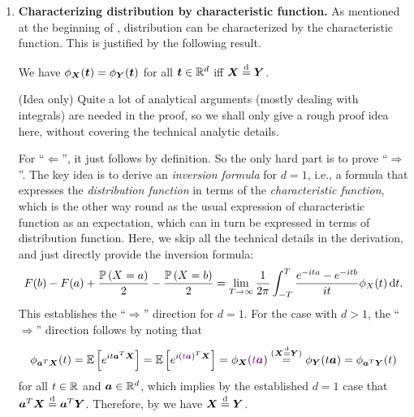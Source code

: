 \begin{enumerate}
\begin{pf}
``\(\Leftarrow\)'': The idea is similar. Fix any \(\vect{a}\in\R^{d}\) and assume
\(\vect{a}^{T}\vect{X}\eqd\vect{a}^{T}\vect{Y}\). Taking
\(\vect{X}_n=\vect{X}\)
for every \(n\in\N\), we have
\(\vect{a}^{T}\vect{X}_n\tod \vect{a}^{T}\vect{X}\)
and \(\vect{a}^{T}\vect{X}_n\tod \vect{a}^{T}\vect{Y}\). Hence,
applying  twice yields \(\vect{X}_n\tod
\vect{X}\) and \(\vect{X}_n\tod\vect{Y}\)
for all \(\vect{a}\in\R^{d}\). Due to the uniqueness of limiting distribution
(), we must then have
\(\vect{X}\eqd \vect{Y}\) for all
\(\vect{a}\in\R^{d}\).
\end{pf}
\item \textbf{Characterizing distribution by characteristic function.}
As mentioned at the beginning of , distribution can be
characterized by the characteristic function. This is justified by the
following result.
\begin{theorem}
\label{thm:cf-char-dist}
We have \(\phi_{\bm{X}}(\bm{t})=\phi_{\bm{Y}}(\bm{t})\) for all
\(\bm{t}\in\mathbb{R}^{d}\) iff \(\vect{X}\eqd \vect{Y}\).
\end{theorem}
\begin{pf} (Idea only)
Quite a lot of analytical arguments (mostly dealing with integrals) are needed
in the proof, so we shall only give a rough proof idea here, without covering
the technical analytic details.

For ``\(\Leftarrow\)'', it just follows by definition. So the only hard part is
to prove ``\(\Rightarrow\)''. The key idea is to derive an \emph{inversion
formula} for \(d=1\), i.e., a formula that expresses the \emph{distribution
function} in terms of the \emph{characteristic function}, which is the other
way round as the usual expression of characteristic function as an expectation,
which can in turn be expressed in terms of distribution function.
Here, we skip all the technical details in the derivation, and just directly
provide the inversion formula:
\begin{equation}
\label{eq:char-fn-invers-fmla}
F(b)-F(a)+\frac{\prob{X=a}}{2}-\frac{\prob{X=b}}{2}
=\lim_{T\to\infty}\frac{1}{2\pi}\int_{-T}^{T}
\frac{e^{-ita}-e^{-itb}}{it}\phi_{X}(t)\odif{t}.
\end{equation}
This establishes the ``\(\Rightarrow\)'' direction for \(d=1\). For the case
with \(d>1\), the ``\(\Rightarrow\)'' direction follows by noting that
\[
\phi_{\vect{a}^{T}\vect{X}}(t)=\expv{e^{it\vect{a}^{T}\vect{X}}}
=\expv{e^{i(\vc{t\vect{a}})^{T}\vect{X}}}
=\phi_{\vect{X}}(\vc{t\vect{a}})\overset{(\vect{X}\eqd \vect{Y})}{=}
\phi_{\vect{Y}}(t\vect{a})=\phi_{\vect{a}^{T}\vect{Y}}(t)
\]
for all \(t\in\mathbb{R}\) and \(\vect{a}\in\R^{d}\), which implies by the established
\(d=1\) case that \(\vect{a}^{T}\vect{X}\eqd \vect{a}^{T}\vect{Y}\). Therefore,
by  we have \(\vect{X}\eqd \vect{Y}\).
\end{pf}


\end{enumerate}
